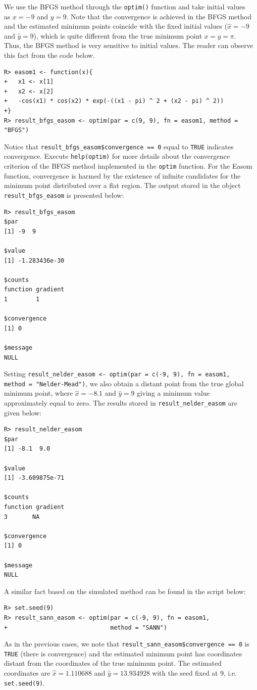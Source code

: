 \documentclass[10pt,letterpaper]{article}
\begin{document}
We use the BFGS method through the \texttt{optim()} function and take initial values as $x=-9$ and $y=9$.
Note that the convergence is achieved in the BFGS method and the estimated minimum points coincide with the fixed initial values  ($\widehat{x}=-9$ and $\widehat{y}=9$),
which is quite different from the true minimum  point $x=y=\pi$.
Thus, the BFGS  method is very sensitive to initial values.
The reader can observe this fact from the code below.
\begin{verbatim}
R> easom1 <- function(x){
+   x1 <- x[1]
+   x2 <- x[2]
+   -cos(x1) * cos(x2) * exp(-((x1 - pi) ^ 2 + (x2 - pi) ^ 2))
+}
R> result_bfgs_easom <- optim(par = c(9, 9), fn = easom1, method = "BFGS")
\end{verbatim}
Notice that \texttt{result\_bfgs\_easom\$convergence == 0} equal to \texttt{TRUE} indicates convergence.
Exe\-cute \texttt{help(optim)} for more details about the convergence criterion of the BFGS method implemented in the \texttt{optim} function.
For the Easom function, convergence is harmed by the existence of infinite candidates for the minimum point distributed over a flat region.
The output stored in the object  \texttt{result\_bfgs\_easom} is presented below:
\begin{verbatim}
R> result_bfgs_easom
$par
[1] -9  9
		
$value
[1] -1.283436e-30
		
$counts
function gradient
1        1
		
$convergence
[1] 0
		
$message
NULL
\end{verbatim}
Setting \texttt{result\_nelder\_easom <- optim(par = c(-9, 9), fn = easom1, method = \newline"Nelder-Mead")},
we also obtain a distant  point from the true global minimum point,
where $\widehat{x}=-8.1$ and $\widehat{y}=9$ giving a minimum value approximately equal to zero.
The results stored in \texttt{result\_nelder\_easom} are given below:
\begin{verbatim}
R> result_nelder_easom
$par
[1] -8.1  9.0

$value
[1] -3.609875e-71

$counts
function gradient
3       NA

$convergence
[1] 0

$message
NULL
\end{verbatim}
A similar fact based on the simulated method  can be found in the script below:
\begin{verbatim}
R> set.seed(9)
R> result_sann_easom <- optim(par = c(-9, 9), fn = easom1,
+                             method = "SANN")
\end{verbatim}
As in the previous cases, we note that \texttt{result\_sann\_easom\$convergence == 0} is \texttt{TRUE} (there is convergence) and
the estimated minimum point has coordinates distant from the coordinates of the true minimum point.
The estimated coordinates are $\widehat{x}=1.110688$ and $\widehat{y}=13.934928$ with the seed fixed at 9, i.e. \texttt{set.seed(9)}.
\end{document}
